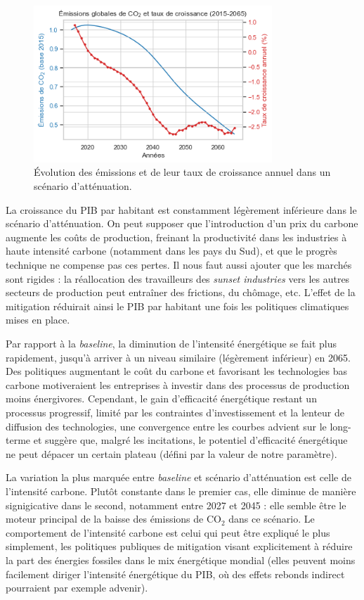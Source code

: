 \documentclass[a4,11pt]{aleph-notas}
\begin{document}
\begin{figure}[H]
    \centering
    \includegraphics[width=0.8\textwidth]{images_IMACLIM/emissions_taux_attenuation.png}
    \caption{Évolution des émissions et de leur taux de croissance annuel dans un scénario d'atténuation.}
    \label{fig:emissions_taux_attenuation}
\end{figure} 

La croissance du PIB par habitant est constamment légèrement inférieure dans le scénario d'atténuation. On peut supposer que l'introduction d'un prix du carbone augmente les coûts de production, freinant la productivité dans les industries à haute intensité carbone (notamment dans les pays du Sud), et que le progrès technique ne compense pas ces pertes. Il nous faut aussi ajouter que les marchés sont rigides : la réallocation des travailleurs des \textit{sunset industries} vers les autres secteurs de production peut entraîner des frictions, du chômage, etc. L'effet de la mitigation réduirait ainsi le PIB par habitant une fois les politiques climatiques mises en place. 

Par rapport à la \textit{baseline}, la diminution de l’intensité énergétique se fait plus rapidement, jusqu'à arriver à un niveau similaire (légèrement inférieur) en 2065. Des politiques augmentant le coût du carbone et favorisant les technologies bas carbone motiveraient les entreprises à investir dans des processus de production moins énergivores. Cependant, le gain d'efficacité énergétique restant un processus progressif, limité par les contraintes d’investissement et la lenteur de diffusion des technologies, une convergence entre les courbes advient sur le long-terme et suggère que, malgré les incitations, le potentiel d’efficacité énergétique ne peut dépacer un certain plateau (défini par la valeur de notre paramètre).

La variation la plus marquée entre \textit{baseline} et scénario d'atténuation est celle de l'intensité carbone. Plutôt constante dans le premier cas, elle diminue de manière signigicative dans le second, notamment entre 2027 et 2045 : elle semble être le moteur principal de la baisse des émissions de CO$_2$ dans ce scénario. Le comportement de l'intensité carbone est celui qui peut être expliqué le plus simplement, les politiques publiques de mitigation visant explicitement à réduire la part des énergies fossiles dans le mix énergétique mondial (elles peuvent moins facilement diriger l'intensité énergétique du PIB, où des effets rebonds indirect pourraient  par exemple advenir).
\end{document}
